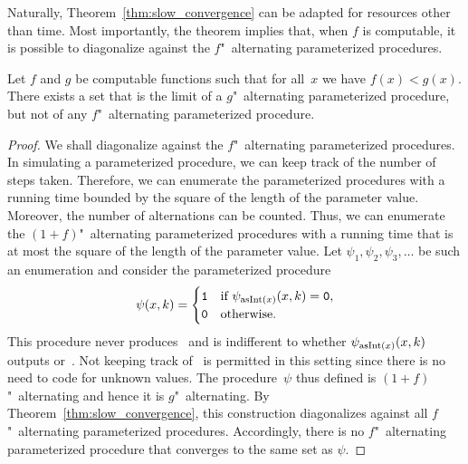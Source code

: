 Naturally, Theorem~\ref{thm:slow_convergence} can be adapted for resources other than time.
Most importantly, the theorem implies that, when $f$ is computable, it is possible to diagonalize against the $f$"~alternating parameterized procedures.
\begin{lemma}
\label{lem:computable_hierarchy}%
  Let $f$ and $g$ be computable functions such that for all~$x$ we have $f(x) < g(x)$.
  There exists a set that is the limit of a $g$"~alternating parameterized procedure, but not of any $f$"~alternating parameterized procedure.
\end{lemma}
\begin{proof}
  We shall diagonalize against the $f$"~alternating parameterized procedures.
  In simulating a parameterized procedure, we can keep track of the number of steps taken.
  Therefore, we can enumerate the parameterized procedures with a running time bounded by the square of the length of the parameter value.
  Moreover, the number of alternations can be counted.
  Thus, we can enumerate the $(1 + f)$"~alternating parameterized procedures with a running time that is at most the square of the length of the parameter value.
  Let $\psi_1, \psi_2, \psi_3, \ldots$ be such an enumeration and consider the parameterized procedure
  \begin{equation*}
    \psi(x, k) = \begin{cases}
      \textnormal{\texttt{1}}	&\text{if $\psi_{\operatorname{asInt}(x)}(x, k) = \textnormal{\texttt{0}}$}, \\
      \textnormal{\texttt{0}}	&\text{otherwise}.
    \end{cases}
  \end{equation*}
  This procedure never produces~ and is indifferent to whether $\psi_{\operatorname{asInt}(x)}(x, k)$ outputs  or~.
  Not keeping track of~ is permitted in this setting since there is no need to code for unknown values.
  The procedure~$\psi$ thus defined is $(1 + f)$"~alternating and hence it is $g$"~alternating.
  By Theorem~\ref{thm:slow_convergence}, this construction diagonalizes against all $f$"~alternating parameterized procedures.
  Accordingly, there is no $f$"~alternating parameterized procedure that converges to the same set as $\psi$.
\end{proof}


